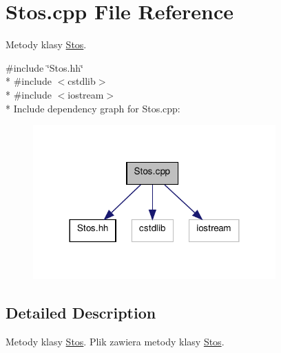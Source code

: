\hypertarget{a00015}{\section{Stos.\-cpp File Reference}
\label{a00015}
}


Metody klasy \hyperlink{a00005}{Stos}.  


{\ttfamily \#include \char`\"{}Stos.\-hh\char`\"{}}\\*
{\ttfamily \#include $<$cstdlib$>$}\\*
{\ttfamily \#include $<$iostream$>$}\\*
Include dependency graph for Stos.\-cpp\-:\nopagebreak
\begin{figure}[H]
\begin{center}
\leavevmode
\includegraphics[width=264pt]{a00029}
\end{center}
\end{figure}


\subsection{Detailed Description}
Metody klasy \hyperlink{a00005}{Stos}. Plik zawiera metody klasy \hyperlink{a00005}{Stos}. 